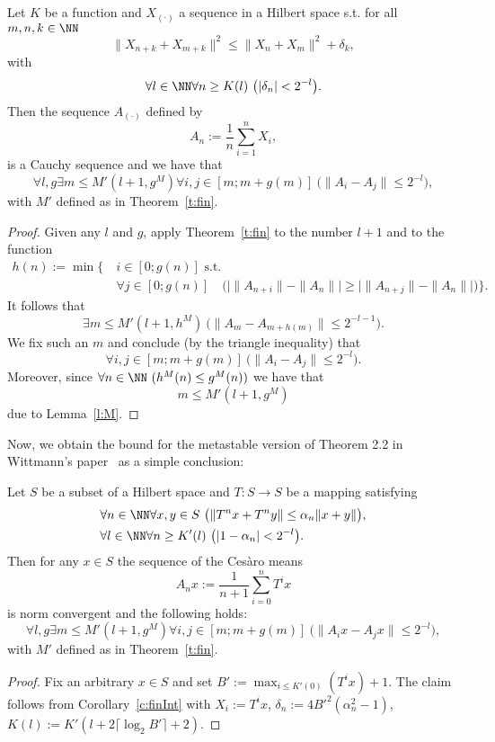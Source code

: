 \begin{cor} \label{c:finInt}
Let $K$ be a function and $X_{(\cdot)}$ a sequence in a Hilbert space s.t. for all $m,n,k\in\NN$
\[
\|X_{n+k} + X_{m+k}\|^2 \leq \|X_{n} + X_{m}\|^2+\delta_k,
\]
with
\[
\forall l\in\NN\forall n\geq K(l)\ \big( |\delta_{n}|<2^{-l}\big).
\]
Then the sequence $A_{(\cdot)}$ defined by
\[
A_n:=\frac{1}{n}\sum^n_{i=1}X_i,
\]
is a Cauchy sequence and we have that
\[
\forall l,g \exists m\leq M'(l+1,g^M)\forall i,j\in[m;m+g(m)]\ \big( \|A_{i}-A_{j}\|\leq 2^{-l} \big),
\]
with $M'$ defined as in Theorem~\ref{t:fin}.
\end{cor}
\begin{proof}
Given any $l$ and $g$, apply Theorem~\ref{t:fin} to the number $l+1$ and to the function
\begin{align*}
h(n):=\min\Big\{\ &i\in [0;g(n)] \text{ s.t. }\\
 &\forall j\in[0;g(n)]\quad \Big(\big| \|A_{n+i}\| - \|A_n\| \big| \geq \big| \|A_{n+j}\|- \|A_n\|\big|\Big) \Big\}.
\end{align*}
It follows that 
\[
\exists m\leq M'(l+1,h^M)\ \big( \|A_{m}-A_{m+h(m)}\|\leq 2^{-l-1} \big).
\]
We fix such an $m$ and conclude (by the triangle inequality) that
\[
\forall i,j\in[m;m+g(m)]\ \big( \|A_{i}-A_{j}\|\leq 2^{-l} \big).
\]
Moreover, since $\forall n\in\NN\ (h^M(n)\leq g^M(n))$ we have that \[m\leq M'(l+1,g^M)\] due to Lemma~\ref{l:M}.
\end{proof}

Now, we obtain the bound for the metastable version of Theorem 2.2 in Wittmann's paper~\cite{Wittmann90} as a simple conclusion:

\begin{cor} \label{c:fin22}
Let $S$ be a subset of a Hilbert space and $T:S\to S$
be a mapping satisfying
\begin{align*}
&\forall n\in\NN\forall x,y\in S\ \big(\| T^nx + T^ny \| \leq \alpha_n\|x + y\|\big),\\ %
&\forall l\in\NN\forall n\geq K'(l)\ \big( |1-\alpha_{n}|<2^{-l}\big). %
\end{align*}
Then for any $x\in S$ the sequence of the Ces{\`a}ro means
\[
A_nx:=\frac{1}{n+1}\sum^{n}_{i=0} T^i x
\]
is norm convergent and the following holds:
\[
\forall l,g \exists m\leq M'(l+1,g^M)\forall i,j\in[m;m+g(m)]\ \big( \|A_{i}x-A_{j}x\|\leq 2^{-l}\big ),
\]
with $M'$ defined as in Theorem~\ref{t:fin}.
\end{cor}
\begin{proof}
Fix an arbitrary $x\in S$ and set $B':=\max_{i\leq K'(0)}(T^ix)+1.$
The claim follows from Corollary~\ref{c:finInt} with 
$X_i:=T^ix$, $\delta_n:=4B'^2(\alpha_n^2-1)$, $K(l):=K'(l+2\lceil\log_2 B' \rceil+2)$.
\end{proof}

